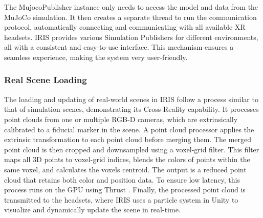 The MujocoPublisher instance only needs to access the model and data from the MuJoCo simulation. It then creates a separate thread to run the communication protocol, automatically connecting and communicating with all available XR headsets.
IRIS provides various Simulation Publishers for different environments, all with a consistent and easy-to-use interface. This mechanism ensures a seamless experience, making the system very user-friendly.
% 

\subsubsection{Real Scene Loading}
\label{sec:real_world_teleop}


The loading and updating of real-world scenes in IRIS follow a process similar to that of simulation scenes, demonstrating its Cross-Reality capability.
It processes point clouds from one or multiple RGB-D cameras, which are extrinsically calibrated to a fiducial marker in the scene. A point cloud processor applies the extrinsic transformation to each point cloud before merging them. The merged point cloud is then cropped and downsampled using a voxel-grid filter.
This filter maps all 3D points to voxel-grid indices, blends the colors of points within the same voxel, and calculates the voxels centroid.
The output is a reduced point cloud that retains both color and position data.
To ensure low latency, this process runs on the GPU using Thrust \cite{bell2012thrust}.
Finally, the processed point cloud is transmitted to the headsets, where IRIS uses a particle system in Unity to visualize and dynamically update the scene in real-time.


